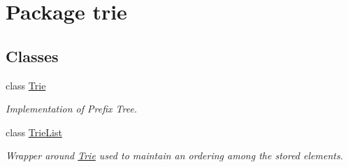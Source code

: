 \hypertarget{namespacetrie}{}\section{Package trie}
\label{namespacetrie}
\subsection*{Classes}
\begin{DoxyCompactItemize}
\item 
class \hyperlink{classtrie_1_1_trie}{Trie}
\begin{DoxyCompactList}\small\item\em Implementation of Prefix Tree. \end{DoxyCompactList}\item 
class \hyperlink{classtrie_1_1_trie_list}{Trie\+List}
\begin{DoxyCompactList}\small\item\em Wrapper around \hyperlink{classtrie_1_1_trie}{Trie} used to maintain an ordering among the stored elements. \end{DoxyCompactList}\end{DoxyCompactItemize}

